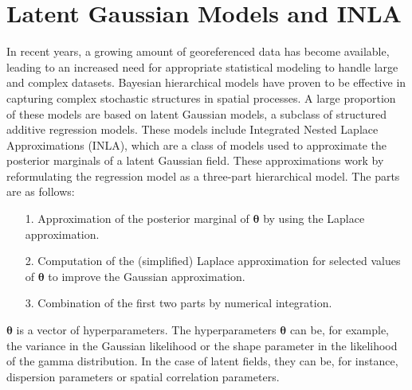 \section{Latent Gaussian Models and INLA}
In recent years, a growing amount of georeferenced data has become available, leading to an increased need for appropriate statistical modeling to handle large and complex datasets. Bayesian hierarchical models have proven to be effective in capturing complex stochastic structures in spatial processes. A large proportion of these models are based on latent Gaussian models, a subclass of structured additive regression models. These models include Integrated Nested Laplace Approximations (INLA), which are a class of models used to approximate the posterior marginals of a latent Gaussian field. These approximations work by reformulating the regression model as a three-part hierarchical model. The parts are as follows:
\begin{itemize}
    \item[1.] Approximation of the posterior marginal of $\pmb{\theta}$ by using the Laplace approximation.
    \item[2.] Computation of the (simplified) Laplace approximation for selected values of $\pmb{\theta}$ to improve the Gaussian approximation.
    \item[3.] Combination of the first two parts by numerical integration.
\end{itemize}
$\pmb{\theta}$ is a vector of hyperparameters. The hyperparameters $\pmb{\theta}$ can be, for example, the variance in the Gaussian likelihood or the shape parameter in the likelihood of the gamma distribution. In the case of latent fields, they can be, for instance, dispersion parameters or spatial correlation parameters. \autocite[][]{rue2009approximate}
